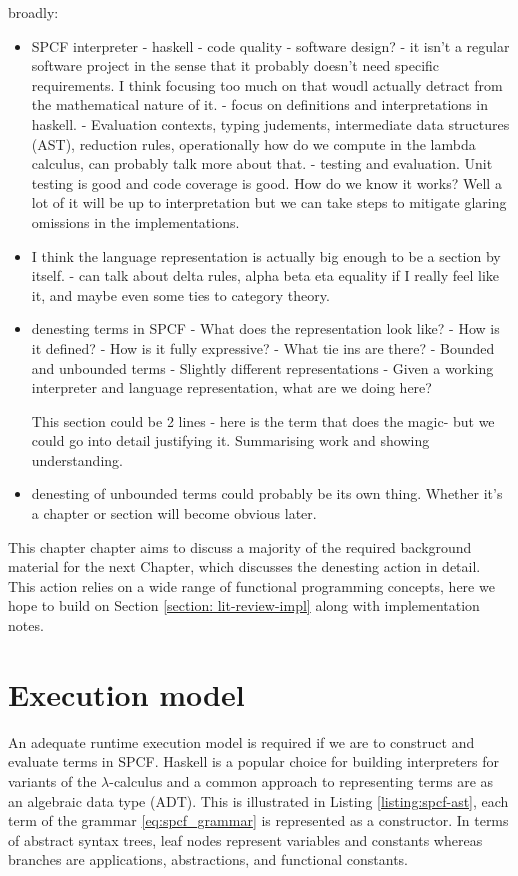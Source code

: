 \documentclass[12pt,a4paper]{report}
\theoremstyle{definition}
\theoremstyle{remark}
\begin{document}
broadly:
\begin{itemize}
    \item SPCF interpreter
        - haskell 
        - code quality
        - software design?
        - it isn't a regular software project in the sense that it probably doesn't need specific requirements. I think focusing too much on that woudl actually detract from the mathematical nature of it.
        - focus on definitions and interpretations in haskell.
        - Evaluation contexts, typing judements, intermediate data structures (AST), reduction rules, operationally how do we compute in the lambda calculus, can probably talk more about that.
        - testing and evaluation. Unit testing is good and code coverage is good. How do we know it works? Well a lot of it will be up to interpretation but we can take steps to mitigate glaring omissions in the implementations.
    \item I think the language representation is actually big enough to be a section by itself.
        - can talk about delta rules, alpha beta eta equality if I really feel like it, and maybe even some ties to category theory.
    \item denesting terms in SPCF
        - What does the representation look like?
        - How is it defined?
        - How is it fully expressive?
        - What tie ins are there? 
        - Bounded and unbounded terms
        - Slightly different representations
        - Given a working interpreter and language representation, what are we doing here?

        This section could be 2 lines - here is the term that does the magic- but we could go into detail justifying it. Summarising work and showing understanding.
    \item denesting of unbounded terms could probably be its own thing. Whether it's a chapter or section will become obvious later.
\end{itemize}

This chapter chapter aims to discuss a majority of the required background material for the next Chapter, which discusses the denesting action in detail. This action relies on a wide range of functional programming concepts, here we hope to build on Section \ref{section: lit-review-impl} along with implementation notes.

\section{Execution model}\label{section: language representation}
An adequate runtime execution model is required if we are to construct and evaluate terms in SPCF. Haskell is a popular choice for building interpreters for variants of the $\lambda$-calculus and a common approach to representing terms are as an algebraic data type (ADT). This is illustrated in Listing \ref{listing:spcf-ast}, each term of the grammar \eqref{eq:spcf_grammar} is represented as a constructor. In terms of abstract syntax trees, leaf nodes represent variables and constants whereas branches are applications, abstractions, and functional constants. 
\end{document}
